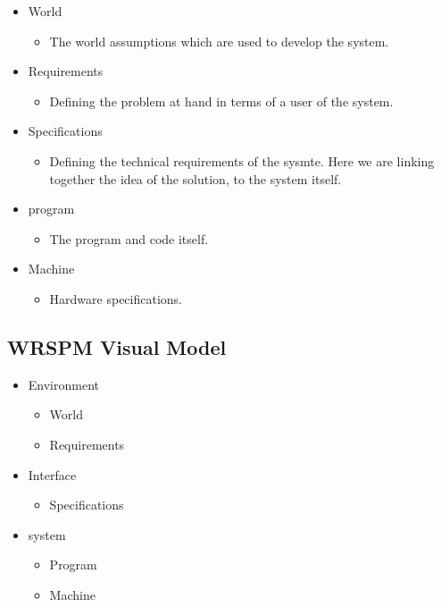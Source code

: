         \begin{itemize}
            \item World
            \begin{itemize}
                \item The world assumptions which are used to develop the system.
            \end{itemize}
            \item Requirements
            \begin{itemize}
                \item Defining the problem at hand in terms of a user of the system.
            \end{itemize}
            \item Specifications
            \begin{itemize}
                \item Defining the technical requirements of the sysmte. Here we are linking together the idea of the solution, to the system itself.
            \end{itemize}
            \item program
            \begin{itemize}
                \item The program and code itself.
            \end{itemize}
            \item Machine
            \begin{itemize}
                \item Hardware specifications.
            \end{itemize}
        \end{itemize}

    \subsection{WRSPM Visual Model}

        \begin{itemize}
            \item Environment
            \begin{itemize}
                \item World
                \item Requirements
            \end{itemize}
            \item Interface
            \begin{itemize}
                \item Specifications
            \end{itemize}
            \item system
            \begin{itemize}
                \item Program
                \item Machine
            \end{itemize}
        \end{itemize}

